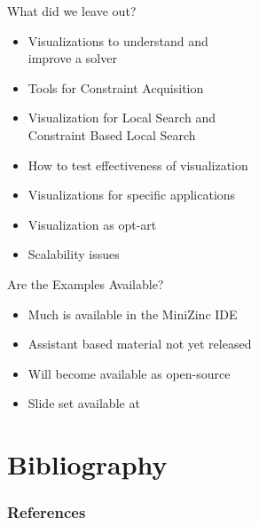 \documentclass[dvipsnames,aspectratio=169]{beamer}
\begin{document}
\begin{frame}{What did we leave out?}
\begin{itemize}
    \item<+-|alert@+> Visualizations to understand and\\ improve a solver
    \item<+-|alert@+> Tools for Constraint Acquisition
    \item<+-|alert@+> Visualization for Local Search and\\ Constraint Based Local Search\\\cite{DBLP:journals/constraints/DoomsHM09}
    \item<+-|alert@+> How to test effectiveness of visualization
    \item<+-|alert@+> Visualizations for specific applications
    \item<+-|alert@+> Visualization as opt-art\\ \cite{DBLP:conf/cpaior/Bosch06,DBLP:journals/anor/CambazardHOO11}
    \item<+-|alert@+> Scalability issues
\end{itemize}    
\end{frame}

\begin{frame}{Are the Examples Available?}
\begin{itemize}
    \item Much is available in the MiniZinc IDE
    \item Assistant based material not yet released
    \item Will become available as open-source
    \item Slide set available at \url{}
\end{itemize}    
\end{frame}
\section{Bibliography}


\nocite{DBLP:conf/discipl/SimonisCDFNT00}
\nocite{DBLP:journals/tvcg/LiuDTGM21}
\nocite{DBLP:journals/tvcg/GoodwinMDBTW17}
\nocite{DBLP:journals/constraints/ShishmarevMTB16}
\nocite{DBLP:conf/ppdp/CameronBMM03}
\nocite{DBLP:conf/cp/Meier95}
\nocite{DBLP:conf/discipl/CarroH00}
\nocite{DBLP:conf/discipl/CarroH00a}
\nocite{DBLP:conf/agp/CarroH98}
\nocite{DBLP:conf/discipl/DeransartHM00}
\nocite{DBLP:conf/iclp/Deransart04}
\nocite{DBLP:journals/constraints/DoomsHM09}
\nocite{DBLP:conf/cpaior/LeoT17}
\nocite{DBLP:journals/constraints/FagesSC04}
\nocite{DBLP:conf/softvis/GhoniemCFJ05}

\begin{frame}[allowframebreaks]
\frametitle{References}


\end{frame}
\end{document}
